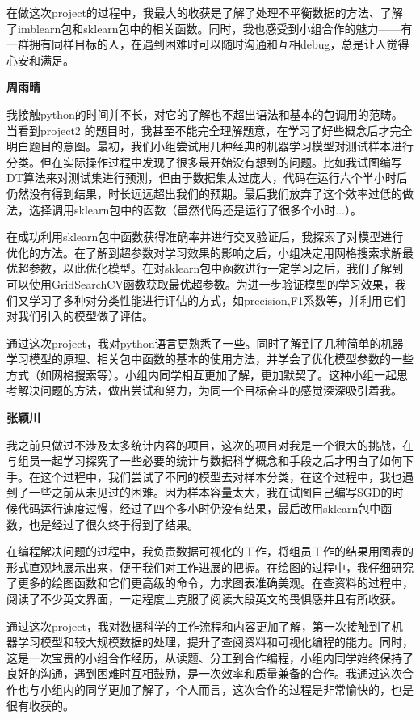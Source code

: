 \documentclass[a4paper,12pt]{article}
\begin{document}
在做这次project的过程中，我最大的收获是了解了处理不平衡数据的方法、了解了imblearn包和sklearn包中的相关函数。同时，我也感受到小组合作的魅力——有一群拥有同样目标的人，在遇到困难时可以随时沟通和互相debug，总是让人觉得心安和满足。

\par

\textbf{周雨晴}

我接触python的时间并不长，对它的了解也不超出语法和基本的包调用的范畴。当看到project2 的题目时，我甚至不能完全理解题意，在学习了好些概念后才完全明白题目的意图。最初，我们小组尝试用几种经典的机器学习模型对测试样本进行分类。但在实际操作过程中发现了很多最开始没有想到的问题。比如我试图编写DT算法来对测试集进行预测，但由于数据集太过庞大，代码在运行六个半小时后仍然没有得到结果，时长远远超出我们的预期。最后我们放弃了这个效率过低的做法，选择调用sklearn包中的函数（虽然代码还是运行了很多个小时...）。

在成功利用sklearn包中函数获得准确率并进行交叉验证后，我探索了对模型进行优化的方法。在了解到超参数对学习效果的影响之后，小组决定用网格搜索求解最优超参数，以此优化模型。在对sklearn包中函数进行一定学习之后，我们了解到可以使用GridSearchCV函数获取最优超参数。为进一步验证模型的学习效果，我们又学习了多种对分类性能进行评估的方式，如precision,F1系数等，并利用它们对我们引入的模型做了评估。

通过这次project，我对python语言更熟悉了一些。同时了解到了几种简单的机器学习模型的原理、相关包中函数的基本的使用方法，并学会了优化模型参数的一些方式（如网格搜索等）。小组内同学相互更加了解，更加默契了。这种小组一起思考解决问题的方法，做出尝试和努力，为同一个目标奋斗的感觉深深吸引着我。

\par

\textbf{张颖川}

我之前只做过不涉及太多统计内容的项目，这次的项目对我是一个很大的挑战，在与组员一起学习探究了一些必要的统计与数据科学概念和手段之后才明白了如何下手。在这个过程中，我们尝试了不同的模型去对样本分类，在这个过程中，我也遇到了一些之前从未见过的困难。因为样本容量太大，我在试图自己编写SGD的时候代码运行速度过慢，经过了四个多小时仍没有结果，最后改用sklearn包中函数，也是经过了很久终于得到了结果。

在编程解决问题的过程中，我负责数据可视化的工作，将组员工作的结果用图表的形式直观地展示出来，便于我们对工作进展的把握。在绘图的过程中，我仔细研究了更多的绘图函数和它们更高级的命令，力求图表准确美观。在查资料的过程中，阅读了不少英文界面，一定程度上克服了阅读大段英文的畏惧感并且有所收获。

通过这次project，我对数据科学的工作流程和内容更加了解，第一次接触到了机器学习模型和较大规模数据的处理，提升了查阅资料和可视化编程的能力。同时，这是一次宝贵的小组合作经历，从读题、分工到合作编程，小组内同学始终保持了良好的沟通，遇到困难时互相鼓励，是一次效率和质量兼备的合作。我通过这次合作也与小组内的同学更加了解了，个人而言，这次合作的过程是非常愉快的，也是很有收获的。
\end{document}
